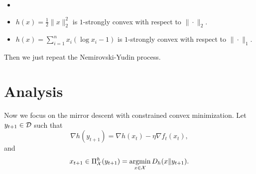 \begin{example}
\label{eg: Examples of mirror maps}
\begin{itemize}
    \item []
    \item $h(x) = \frac{1}{2} \|x\|_2^2$ is $1$-strongly convex with respect to $\|\cdot \|_2$. 
    \item $h(x)= \sum_{i=1}^{n} x_i (\log x_i -1)$ is $1$-strongly convex with respect to $\|\cdot \|_1$.   
\end{itemize}
\end{example}

Then we just repeat the Nemirovski-Yudin process.

\section{Analysis}

Now we focus on the mirror descent with constrained convex minimization. Let $y_{t+1}\in \mathcal{D}$ such that 
\begin{equation}
\label{eq: MD update yt}
    \nabla h(y_{t+1}) = \nabla h(x_t) - \eta \nabla f_t(x_t), 
\end{equation}
and 
\begin{equation}
\label{eq: MD update projection}
    x_{t+1} \in \Pi_{\mathcal{X}}^{h}(y_{t+1}) = \mathop{\mathrm{argmin}}_{x\in \mathcal{X}} D_h(x\|y_{t+1}).
\end{equation}

